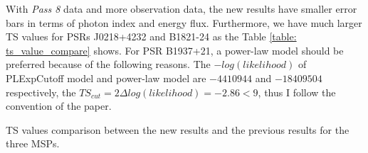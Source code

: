 \documentclass[12pt]{report}
\newcommand{\mycaption}[1]{\protect \caption{#1}}
\begin{document}
    \begin{table}[!htp]
      \centering 
      \caption{Fit results of power-law model for PSR B1937+21. Since the previous paper 
        does not show the photon flux, I cannot calculate the error bars of photon flux for 
        the previous value.}
      \label{table: final_results_j1939_pl}
    \end{table}
  
    With \textit{Pass 8} data and more observation data, the new results have smaller error bars
    in terms of photon index and energy flux. Furthermore, we have much larger TS values for 
    PSRs J0218+4232 and B1821-24 as the Table \ref{table: ts_value_compare} shows.
    For PSR B1937+21, a power-law model should be preferred because of the following reasons. 
    The $-log(likelihood)$ of PLExpCutoff model and power-law model are $-4410944$ and 
    $-18409504$ respectively, the $TS_{cut} = 2\Delta log(likelihood) = -2.86 < 9$,  thus I 
    follow the convention of the paper. \citep{2013ApJS..208...17A}

    \begin{table}[!htp]
      \centering
        \mycaption{TS values comparison between the new results and the previous results for 
          the three MSPs. }
        \label{table: ts_value_compare}        
    \end{table}  
\end{document}

